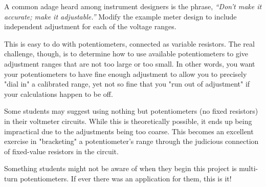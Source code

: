 

A common adage heard among instrument designers is the phrase, {\it ``Don't make it accurate; make it adjustable.''}  Modify the example meter design to include independent adjustment for each of the voltage ranges.







This is easy to do with potentiometers, connected as variable resistors.  The real challenge, though, is to determine how to use available potentiometers to give adjustment ranges that are not too large or too small.  In other words, you want your potentiometers to have fine enough adjustment to allow you to precisely "dial in" a calibrated range, yet not so fine that you "run out of adjustment" if your calculations happen to be off.







Some students may suggest using nothing but potentiometers (no fixed resistors) in their voltmeter circuits.  While this is theoretically possible, it ends up being impractical due to the adjustments being too coarse.  This becomes an excellent exercise in "bracketing" a potentiometer's range through the judicious connection of fixed-value resistors in the circuit.

Something students might not be aware of when they begin this project is multi-turn potentiometers.  If ever there was an application for them, this is it!



